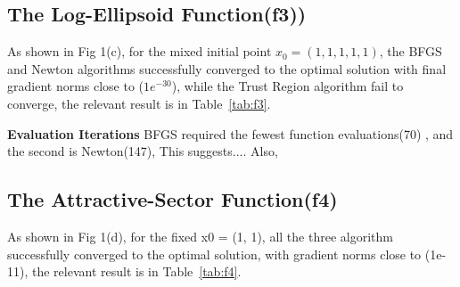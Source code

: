 \documentclass[12pt]{article}
\begin{document}
\subsection{The Log-Ellipsoid Function(f3))}
As shown in Fig 1(c),  for the mixed initial point $x_0 = (1, 1,1 ,1, 1)$, the BFGS and Newton algorithms successfully  converged to the optimal solution with final gradient norms close to ($1e^{-30}$), while the Trust Region algorithm fail to converge, the relevant result is in Table~\ref{tab:f3}.

\textbf{Evaluation Iterations}  BFGS required the fewest function evaluations(70) , and the second is Newton(147),  This suggests....
Also, 

\begin{table}[h]
    \centering

    \caption{Optimization results for the Log-Ellipsoid Function.}
    \label{tab:f3}
\end{table}



\subsection{The Attractive-Sector Function(f4)}
As shown in  Fig 1(d), for the fixed x0 = (1, 1), all the three algorithm  successfully converged to the optimal solution, with gradient norms close to (1e-11), the relevant result is in Table~\ref{tab:f4}.
\end{document}
